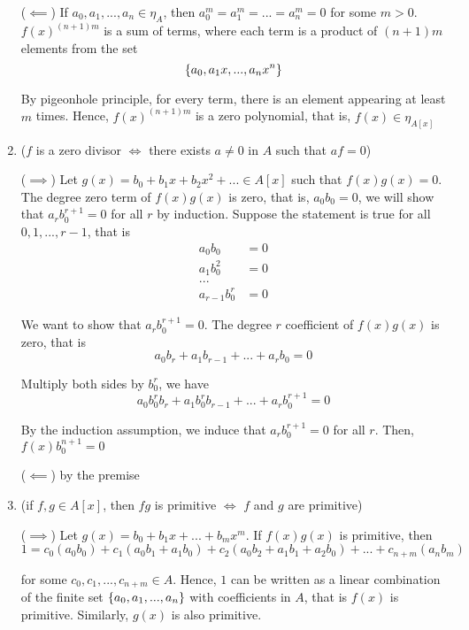 \begin{longproof}
\begin{enumerate}
 		($\impliedby$) If $a_0, a_1, ..., a_n \in \eta_A$, then $a_0^m = a_1^m = ... = a_n^m = 0$ for some $m > 0$. $f(x)^{(n+1)m}$ is a sum of terms, where each term is a product of $(n+1)m$ elements from the set
 		$$
 			\{a_0, a_1 x, ..., a_n x^n\}
 		$$
 		
 		By pigeonhole principle, for every term, there is an element appearing at least $m$ times. Hence, $f(x)^{(n+1)m}$ is a zero polynomial, that is, $f(x) \in \eta_{A[x]}$
 		
 		\item ($f$ is a zero divisor $\iff$ there exists $a \neq 0$ in $A$ such that $af = 0$)
 		
		($\implies$) Let $g(x) = b_0 + b_1 x + b_2 x^2 + ... \in A[x]$ such that $f(x) g(x) = 0$. The degree zero term of $f(x)g(x)$ is zero, that is, $a_0 b_0 = 0$, we will show that $a_r b_0^{r+1} = 0$ for all $r$ by induction. Suppose the statement is true for all $0,1, ..., r-1$, that is
		\begin{align*}
			a_0 b_0 &= 0 \\
			a_1 b_0^2 &= 0 \\
			... \\
			a_{r-1} b_0^r &= 0
		\end{align*}
		
		We want to show that $a_r b_0^{r+1} = 0$. The degree $r$ coefficient of $f(x)g(x)$ is zero, that is
		$$
			a_0 b_r + a_1 b_{r-1} + ... + a_r b_0 = 0
		$$
		
		Multiply both sides by $b_0^r$, we have
		$$
			a_0 b_0^r b_r + a_1 b_0^r b_{r-1} + ... + a_r b_0^{r+1} = 0
		$$
		
		By the induction assumption, we induce that $a_r b_0^{r+1} = 0$ for all $r$. Then, $f(x) b_0^{n+1} = 0$
		
		($\impliedby$) by the premise
		
		\item (if $f, g \in A[x]$, then $fg$ is primitive $\iff$ $f$ and $g$ are primitive)
		
		($\implies$) Let $g(x) = b_0 + b_1 x + ... + b_m x^m$. If $f(x) g(x)$ is primitive, then
		$$
			1 = c_0 (a_0 b_0) + c_1 (a_0 b_1 + a_1 b_0) + c_2 (a_0 b_2 + a_1 b_1 + a_2 b_0) + ... + c_{n+m} (a_n b_m)
		$$
		
		for some $c_0, c_1, ..., c_{n+m} \in A$. Hence, $1$ can be written as a linear combination of the finite set $\{a_0, a_1, ..., a_n\}$ with coefficients in $A$, that is $f(x)$ is primitive. Similarly, $g(x)$ is also primitive.
		

\end{enumerate}
\end{longproof}
